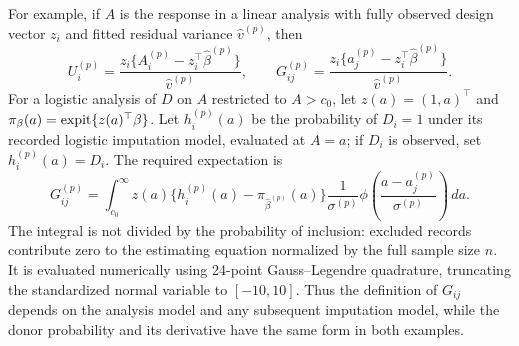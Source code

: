 For example, if \(A\) is the response in a linear analysis with fully
observed design vector \(z_i\) and fitted residual variance
\(\hat v^{(p)}\), then
\[
U_i^{(p)}=\frac{z_i\{A_i^{(p)}-z_i^\top\hat\beta^{(p)}\}}{\hat v^{(p)}},
\qquad
G_{ij}^{(p)}=\frac{z_i\{a_j^{(p)}-z_i^\top\hat\beta^{(p)}\}}{\hat v^{(p)}}.
\]
For a logistic analysis of \(D\) on \(A\) restricted to \(A>c_0\), let
\(z(a)=(1,a)^\top\) and
\(\pi_\beta(a)=\operatorname{expit}\{z(a)^\top\beta\}\). Let \(h_i^{(p)}(a)\)
be the probability of \(D_i=1\) under its recorded logistic imputation
model, evaluated at \(A=a\); if \(D_i\) is observed, set
\(h_i^{(p)}(a)=D_i\). The required expectation is
\begin{equation}
G_{ij}^{(p)}=\int_{c_0}^{\infty}
z(a)\{h_i^{(p)}(a)-\pi_{\hat\beta^{(p)}}(a)\}
\frac{1}{\sigma^{(p)}}
\phi\!\left(\frac{a-a_j^{(p)}}{\sigma^{(p)}}\right)\,da.
\label{pmm-binomial-score}
\end{equation}
The integral is not divided by the probability of inclusion: excluded
records contribute zero to the estimating equation normalized by the
full sample size \(n\). It is evaluated numerically using 24-point
Gauss--Legendre quadrature, truncating the standardized normal variable
to \([-10,10]\). Thus the definition of \(G_{ij}\) depends on the
analysis model and any subsequent imputation model, while the donor
probability and its derivative have the same form in both examples.
